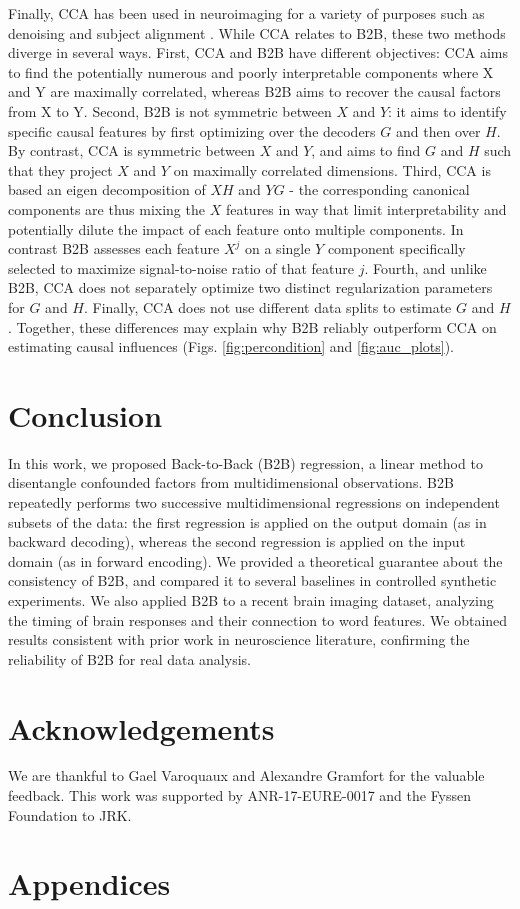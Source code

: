 \documentclass[preprint,12pt,3p]{elsarticle}
\begin{document}
Finally, CCA has been used in neuroimaging for a variety of purposes such as
denoising and subject alignment \citep{cca_hotelling, de2019multiway}. While CCA
relates to B2B, these two methods diverge in several ways. First, CCA and B2B
have different objectives: CCA aims to find the potentially numerous and poorly
interpretable components where X and Y are maximally correlated, whereas B2B
aims to recover the causal factors from X to Y. Second, B2B is not symmetric
between $X$ and $Y$: it aims to identify specific causal features by first
optimizing over the decoders $G$ and then over $H$. By contrast, CCA is
symmetric between $X$ and $Y$, and aims to find $G$ and $H$ such that they
project $X$ and $Y$ on maximally correlated dimensions. Third, CCA is based an
eigen decomposition of $XH$ and $YG$ - the corresponding canonical components
are thus mixing the $X$ features in way that limit interpretability and
potentially dilute the impact of each feature onto multiple components. In
contrast B2B assesses each feature $X^j$ on a single $Y$ component specifically
selected to maximize signal-to-noise ratio of that feature $j$. Fourth, and
unlike B2B, CCA does not separately optimize two distinct regularization
parameters for $G$ and $H$. Finally, CCA does not use different data splits to
estimate $G$ and $H$. Together, these differences may explain why B2B reliably
outperform CCA on estimating causal influences (Figs. \ref{fig:percondition} and
\ref{fig:auc_plots}).




\section{Conclusion}
In this work, we proposed Back-to-Back (B2B) regression, a linear method to
disentangle confounded factors from multidimensional observations.
%
B2B repeatedly performs two successive multidimensional regressions on
independent subsets of the data: the first regression is applied on the output
domain (as in backward decoding), whereas the second regression is applied on
the input domain (as in forward encoding).
%
We provided a theoretical guarantee about the consistency of B2B, and compared
it to several baselines in controlled synthetic experiments.
%
We also applied B2B to a recent brain imaging dataset, analyzing the timing of
brain responses and their connection to word features.
%
We obtained results consistent with prior work in neuroscience literature,
confirming the reliability of B2B for real data analysis.
%

\section{Acknowledgements}
We are thankful to Gael Varoquaux and Alexandre Gramfort for the valuable
feedback. This work was supported by ANR-17-EURE-0017 and the Fyssen Foundation
to JRK.




\newpage
\clearpage
\section{Appendices}

\end{document}

